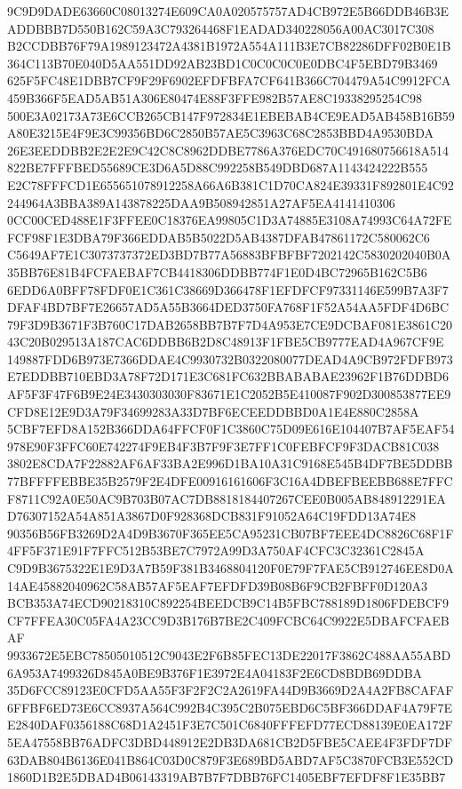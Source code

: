 \documentclass[UTF8,fontset=fandol,zihao=-4,a4paper]{ctexart}
\begin{document}
{{9C9D9DADE63660C08013274E609CA0A020575757AD4CB972E5B66DDB46B3EADDBBB7D550B162C59A3C793264468F1EADAD340228056A00AC3017C308
B2CCDBB76F79A1989123472A4381B1972A554A111B3E7CB82286DFF02B0E1B364C113B70E040D5AA551DD92AB23BD1C0C0C0C0E0DBC4F5EBD79B3469
625F5FC48E1DBB7CF9F29F6902EFDFBFA7CF641B366C704479A54C9912FCA459B366F5EAD5AB51A306E80474E88F3FFE982B57AE8C19338295254C98
500E3A02173A73E6CCB265CB147F972834E1EBEBAB4CE9EAD5AB458B16B59A80E3215E4F9E3C99356BD6C2850B57AE5C3963C68C2853BBD4A9530BDA
26E3EEDDBB2E2E2E9C42C8C8962DDBE7786A376EDC70C491680756618A514822BE7FFFBED55689CE3D6A5D88C992258B549DBD687A1143424222B555
E2C78FFFCD1E655651078912258A66A6B381C1D70CA824E39331F892801E4C92244964A3BBA389A143878225DAA9B508942851A27AF5EA4141410306
0CC00CED488E1F3FFEE0C18376EA99805C1D3A74885E3108A74993C64A72FEFCF98F1E3DBA79F366EDDAB5B5022D5AB4387DFAB47861172C580062C6
C5649AF7E1C3073737372ED3BD7B77A56883BFBFBF7202142C5830202040B0A35BB76E81B4FCFAEBAF7CB4418306DDBB774F1E0D4BC72965B162C5B6
6EDD6A0BFF78FDF0E1C361C38669D366478F1EFDFCF97331146E599B7A3F7DFAF4BD7BF7E26657AD5A55B3664DED3750FA768F1F52A54AA5FDF4D6BC
79F3D9B3671F3B760C17DAB2658BB7B7F7D4A953E7CE9DCBAF081E3861C2043C20B029513A187CAC6DDBB6B2D8C48913F1FBE5CB9777EAD4A967CF9E
149887FDD6B973E7366DDAE4C9930732B0322080077DEAD4A9CB972FDFB973E7EDDBB710EBD3A78F72D171E3C681FC632BBABABAE23962F1B76DDBD6
AF5F3F47F6B9E24E3430303030F83671E1C2052B5E410087F902D300853877EE9CFD8E12E9D3A79F34699283A33D7BF6ECEEDDBBD0A1E4E880C2858A
5CBF7EFD8A152B366DDA64FFCF0F1C3860C75D09E616E104407B7AF5EAF54978E90F3FFC60E742274F9EB4F3B7F9F3E7FF1C0FEBFCF9F3DACB81C038
3802E8CDA7F22882AF6AF33BA2E996D1BA10A31C9168E545B4DF7BE5DDBB77BFFFFEBBE35B2579F2E4DFE00916161606F3C16A4DBEFBEEBB688E7FFC
F8711C92A0E50AC9B703B07AC7DB8818184407267CEE0B005AB848912291EAD76307152A54A851A3867D0F928368DCB831F91052A64C19FDD13A74E8
90356B56FB3269D2A4D9B3670F365EE5CA95231CB07BF7EEE4DC8826C68F1F4FF5F371E91F7FFC512B53BE7C7972A99D3A750AF4CFC3C32361C2845A
C9D9B3675322E1E9D3A7B59F381B3468804120F0E79F7FAE5CB912746EE8D0A14AE45882040962C58AB57AF5EAF7EFDFD39B08B6F9CB2FBFF0D120A3
BCB353A74ECD90218310C892254BEEDCB9C14B5FBC788189D1806FDEBCF9CF7FFEA30C05FA4A23CC9D3B176B7BE2C409FCBC64C9922E5DBAFCFAEBAF
9933672E5EBC78505010512C9043E2F6B85FEC13DE22017F3862C488AA55ABD6A953A7499326D845A0BE9B376F1E3972E4A04183F2E6CD8BDB69DDBA
35D6FCC89123E0CFD5AA55F3F2F2C2A2619FA44D9B3669D2A4A2FB8CAFAF6FFBF6ED73E6CC8937A564C992B4C395C2B075EBD6C5BF366DDAF4A79F7E
E2840DAF0356188C68D1A2451F3E7C501C6840FFFEFD77ECD88139E0EA172F5EA47558BB76ADFC3DBD448912E2DB3DA681CB2D5FBE5CAEE4F3FDF7DF
63DAB804B6136E041B864C03D0C879F3E689BD5ABD7AF5C3870FCB3E552CD1860D1B2E5DBAD4B06143319AB7B7F7DBB76FC1405EBF7EFDF8F1E35BB7
}}
\end{document}
